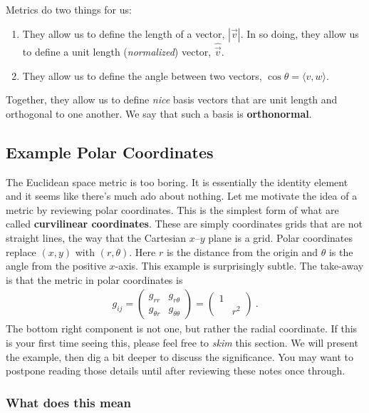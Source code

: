 \documentclass[12pt]{article}
\begin{document}
Metrics do two things for us:
\begin{enumerate}
    \item They allow us to define the length of a vector, $|\vec{v}|$. In so doing, they allow us to define a unit length (\emph{normalized}) vector, $\hat{\vec{v}}$.
    \item They allow us to define the angle between two vectors, $\cos\theta = \langle v,w\rangle$.
\end{enumerate}
Together, they allow us to define \emph{nice} basis vectors that are unit length and orthogonal to one another. We say that such a basis is \textbf{orthonormal}.


\subsection{Example Polar Coordinates}

The Euclidean space metric is too boring. It is essentially the identity element and it seems like there's much ado about nothing. Let me motivate the idea of a metric by reviewing polar coordinates. This is the simplest form of what are called \textbf{curvilinear coordinates}. These are simply coordinates grids that are not straight lines, the way that the Cartesian $x$--$y$ plane is a grid. Polar coordinates replace $(x,y)$ with $(r,\theta)$. Here $r$ is the distance from the origin and $\theta$ is the angle from the positive $x$-axis. 
% 
This example is surprisingly subtle. The take-away is that the metric in polar coordinates is
\begin{align}
    g_{ij} = 
    \begin{pmatrix}
        g_{rr} & g_{r\theta} \\
        g_{\theta r} & g_{\theta\theta}    
    \end{pmatrix}
    =
    \begin{pmatrix}
        1 & \\
        & r^2
    \end{pmatrix} \ .
    \label{eq:polar:metric}
\end{align}
The bottom right component is not one, but rather the radial coordinate. If this is your first time seeing this, please feel free to \emph{skim} this section. We will present the example, then dig a bit deeper to discuss the significance. You may want to postpone reading those details until after reviewing these notes once through.

\subsubsection{What does this mean}
\end{document}
